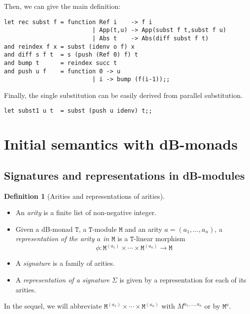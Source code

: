 \documentclass[a4paper,twoside,12pt]{article}
\theoremstyle{definition}
\newtheorem{definition}{Definition}
\theoremstyle{remark}
\theoremstyle{example}
\newcommand{\TT}{\mathtt{T}}
\newcommand{\MM}{\mathtt{M}}
\begin{document}
Then, we can give the main definition:
\begin{verbatim}
let rec subst f = function Ref i    -> f i
                         | App(t,u) -> App(subst f t,subst f u)
                         | Abs t    -> Abs(diff subst f t)
and reindex f x = subst (idenv o f) x
and diff s f t  = s (push (Ref 0) f) t
and bump t      = reindex succ t
and push u f    = function 0 -> u
                         | i -> bump (f(i-1));;
\end{verbatim}

Finally, the single substitution can be easily derived from parallel substitution.
\begin{verbatim}
let subst1 u t  = subst (push u idenv) t;;
\end{verbatim}

\section{Initial semantics with dB-monads}
\label{sec:init-semantics}

\subsection{Signatures and representations in dB-modules}
\label{sec:signatures-representations}

\begin{definition}[Arities and representations of arities]
  \hfill
  \begin{itemize}
  \item An \emph{arity} is a finite list of non-negative integer.
  \item Given a dB-monad $\TT$, a $\TT$-module $\MM$ and an arity
    $a=(a_1,\dots,a_n)$, a \emph{representation of the arity $a$ in
      $\MM$} is a $\TT$-linear morphism
    \begin{equation*}
      \phi:\MM^{(a_1)}\times\cdots\times\MM^{(a_n)} \longrightarrow \MM
    \end{equation*}
  \item A \emph{signature} is a family of arities.
  \item A \emph{representation of a signature} $\Sigma$ is given by a
    representation for each of its arities.
  \end{itemize}
\end{definition}

In the sequel, we will abbreviate
$\MM^{(a_1)}\times\cdots\times\MM^{(a_n)}$ with $M^{a_1,\dots,a_n}$ or
by $\MM^a$.
\end{document}
